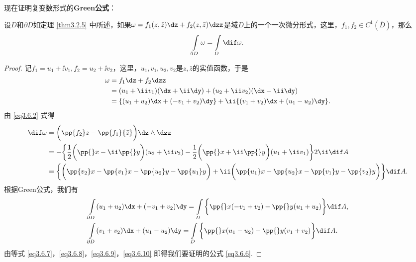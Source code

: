 现在证明复变数形式的\textbf{Green公式}：
\begin{theorem}\label{thm3.6.1}
设$D$和$\partial D$如定理 \ref{thm3.2.5} 中所述，如果$\omega=f_1(z,\bar z)\dz+f_2(z,\bar z)\dzz$是域$D$上的一个一次微分形式，这里，$f_1,f_2\in C^1(\bar D)$，那么
\begin{equation}\label{eq3.6.6}
\int\limits_{\partial D}\omega=\int\limits_D\dif \omega.
\end{equation}
\end{theorem}
\begin{proof}
记$f_1=u_1+\ii v_1,f_2=u_2+\ii v_2$，这里，$u_1,v_1,u_2,v_2$是$z,\bar z$的实值函数，于是
\begin{equation}\label{eq3.6.7}
\begin{aligned}
\omega&=f_1\dz+f_2\dzz\\
&=(u_1+\ii v_1)(\dx+\ii\dy)+(u_2+\ii v_2)(\dx-\ii\dy)\\
&=\{(u_1+u_2)\dx+(-v_1+v_2)\dy\}+\ii\{(v_1+v_2)\dx+(u_1-u_2)\dy\}.
\end{aligned}
\end{equation}
由 \eqref{eq3.6.2} 式得
\begin{equation}\label{eq3.6.8}
\begin{aligned}
\dif \omega&=\bigg(\pp{f_2}z-\pp{f_1}{\bar z}\bigg)\dz\wedge\dzz\\
&=-\bigg\{\frac12\bigg(\pp{}x-\ii\pp{}y\bigg)(u_2+\ii v_2)
 -\frac12\bigg(\pp{}x+\ii\pp{}y\bigg)(u_1+\ii v_1)\bigg\}2\ii\dif A\\
&=\bigg\{\bigg(\pp{v_2}x-\pp{v_1}x-\pp{u_2}y-\pp{u_1}y\bigg)
+\ii\bigg(\pp{u_1}x-\pp{u_2}x-\pp{v_1}y-\pp{v_2}y\bigg)\bigg\}\dif A.
\end{aligned}
\end{equation}
根据Green公式，我们有
\begin{align}
&\int\limits_{\partial D}(u_1+u_2)\dx+(-v_1+v_2)\dy
=\int\limits_D\bigg\{\pp{}x(-v_1+v_2)-\pp{}y(u_1+u_2)\bigg\}\dif A,\label{eq3.6.9}\\
&\int\limits_{\partial D}(v_1+v_2)\dx+(u_1-u_2)\dy
=\int\limits_D\bigg\{\pp{}x(u_1-u_2)-\pp{}y(v_1+v_2)\bigg\}\dif A.\label{eq3.6.10}
\end{align}
由等式 \eqref{eq3.6.7}，\eqref{eq3.6.8}，\eqref{eq3.6.9}，\eqref{eq3.6.10} 即得我们要证明的公式 \eqref{eq3.6.6}.
\end{proof}

